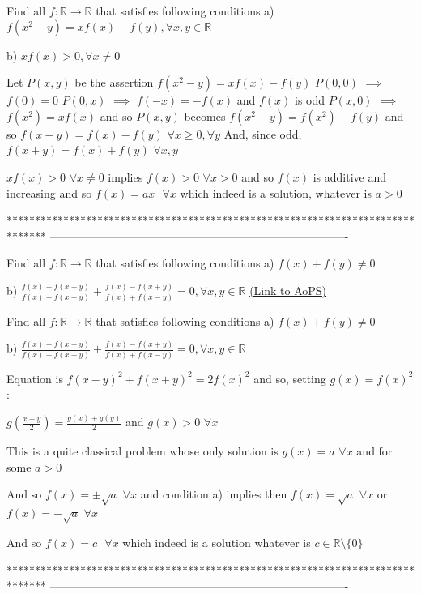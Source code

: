 \begin{solution}
	\begin{tcolorbox}Find all $ f: \mathbb{R}\rightarrow \mathbb{R} $   that satisfies following conditions
a)  $f\left ( x^{2}-y \right )=xf(x)-f(y),\forall x,y\in \mathbb{R}$

b)  $xf(x)> 0,\forall x\neq 0$\end{tcolorbox}
Let $P(x,y)$ be the assertion $f(x^2-y)=xf(x)-f(y)$
$P(0,0)$ $\implies$ $f(0)=0$
$P(0,x)$ $\implies$ $f(-x)=-f(x)$ and $f(x)$ is odd
$P(x,0)$ $\implies$ $f(x^2)=xf(x)$ and so $P(x,y)$ becomes $f(x^2-y)=f(x^2)-f(y)$ and so $f(x-y)=f(x)-f(y)$ $\forall x\ge 0,\forall y$
And, since odd, $f(x+y)=f(x)+f(y)$ $\forall x,y$

$xf(x)>0$ $\forall x\ne 0$ implies $f(x)>0$ $\forall x>0$ and so $f(x)$ is additive and increasing 
and so $\boxed{f(x)=ax\text{  }\forall x}$ which indeed is a solution, whatever is $a>0$
\end{solution}
*******************************************************************************
-------------------------------------------------------------------------------

\begin{problem}
	Find all $ f: \mathbb{R}\rightarrow \mathbb{R} $   that satisfies following conditions
a)  $ f(x)+f(y)\neq 0 $

b)  $  \frac{f(x)-f(x-y)}{f(x)+f(x+y)}+\frac{f(x)-f(x+y)}{f(x)+f(x-y)}=0,\forall x,y\in \mathbb{R}$
	\flushright \href{https://artofproblemsolving.com/community/c6h618330}{(Link to AoPS)}
\end{problem}



\begin{solution}
	\begin{tcolorbox}Find all $ f: \mathbb{R}\rightarrow \mathbb{R} $   that satisfies following conditions
a)  $ f(x)+f(y)\neq 0 $

b)  $  \frac{f(x)-f(x-y)}{f(x)+f(x+y)}+\frac{f(x)-f(x+y)}{f(x)+f(x-y)}=0,\forall x,y\in \mathbb{R}$\end{tcolorbox}
Equation is $f(x-y)^2+f(x+y)^2=2f(x)^2$ and so, setting $g(x)=f(x)^2$ :

$g(\frac{x+y}2)=\frac{g(x)+g(y)}2$ and $g(x)>0$ $\forall x$

This is a quite classical problem whose only solution is $g(x)=a$ $\forall x$ and for some $a>0$

And so $f(x)=\pm\sqrt a$ $\forall x$ and condition a) implies then $f(x)=\sqrt a$ $\forall x$ or $f(x)=-\sqrt a$ $\forall x$

And so $\boxed{f(x)=c\text{  }\forall x}$ which indeed is a solution whatever is $c\in\mathbb R\setminus\{0\}$
\end{solution}
*******************************************************************************
-------------------------------------------------------------------------------

